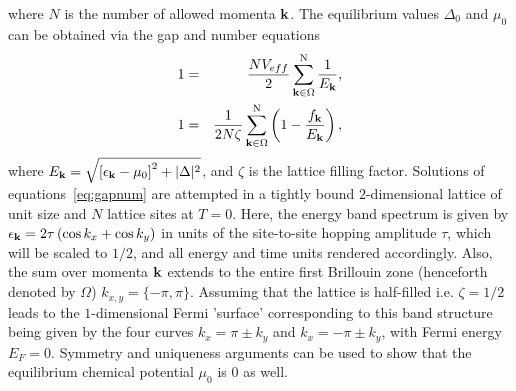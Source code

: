 \documentclass[a4paper,10pt]{article}
\begin{document}
where $N$ is the number of allowed momenta ${\bf k}$. The equilibrium values $\Delta_0$ and $\mu_0$ can be obtained via the gap and number equations
\begin{eqnarray}
\label{eq:gapnum}
 1&=&\frac{N V_{eff}}{2} \sum^{\mathrm N}_{{\bf k}\in\Omega} \frac{1}{E_{\bf k}},  \nonumber \\
 1&=& \frac{1}{2N\zeta}\sum^{\mathrm N}_{{\bf k}\in\Omega} \left( 1-\frac{f_{\bf k}}{E_{\bf k}} \right), 
   \end{eqnarray}
where $E_{\bf k} = \sqrt{\left[\epsilon_{\bf k}-\mu_0\right]^2+|\Delta|^2}$, and $\zeta$ is the lattice filling factor. Solutions of equations~\ref{eq:gapnum} are attempted in a tightly bound $2$-dimensional lattice of unit size and $N$ lattice sites at $T=0$. Here, the energy band spectrum is given by $\epsilon_{\bf k} = 2 \tau\left( \cos{k_x}+\cos{k_y}\right)$ 
in units of the site-to-site hopping amplitude $\tau$, which will be scaled to $1/2$, and all energy and time units rendered accordingly. Also, the sum over momenta ${\bf k}$ extends to the entire first Brillouin zone (henceforth denoted by $\Omega$) $k_{x,y} = \{-\pi,\pi\}$. Assuming that the lattice is half-filled i.e. $\zeta=1/2$ leads to the $1$-dimensional Fermi 'surface' corresponding to this  band structure being given by the four curves $k_x = \pi \pm k_y$ and $k_x = -\pi \pm k_y$, with Fermi energy $E_F = 0$. Symmetry and uniqueness arguments can be used to show that the equilibrium chemical potential $\mu_0$ is $0$ as well. 
\end{document}

